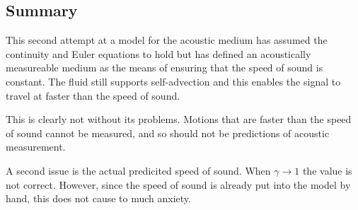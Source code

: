 





\subsection{Summary}

This second attempt at a model for the acoustic medium has assumed the continuity and Euler equations to hold
but has defined an acoustically measureable medium as the means of ensuring that the speed of sound is constant.
The fluid still supports self-advection and this enables the signal to travel at faster than the speed of sound.

This is clearly not without its problems.
Motions that are faster than the speed of sound cannot be measured,
and so should not be predictions of acoustic measurement.

A second issue is the actual predicited speed of sound.
When $\gamma \rightarrow 1$ the value is not correct.
However, since the speed of sound is
already put into the model by hand,
this does not cause to much anxiety.



